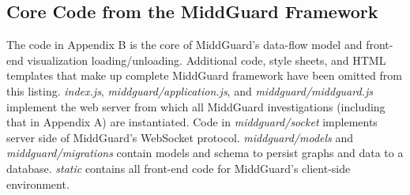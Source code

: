 \documentclass[midd]{thesis}
\begin{document}
\begin{landscape}
  \chapter{Core Code from the MiddGuard Framework}

  \addtolength{\hoffset}{-2cm}
  \addtolength{\textheight}{2cm}

  \begin{multicols}{2}

    The code in Appendix B is the core of MiddGuard's data-flow model and
    front-end visualization loading/unloading. Additional code, style sheets,
    and HTML templates that make up complete MiddGuard framework have been
    omitted from this listing. \textit{index.js},
    \textit{middguard/application.js}, and \textit{middguard/middguard.js}
    implement the web server from which all MiddGuard investigations (including
    that in Appendix A) are instantiated. Code in
    \textit{middguard/socket} implements server side of MiddGuard's WebSocket
    protocol. \textit{middguard/models} and \textit{middguard/migrations}
    contain models and schema to persist graphs and data to a database.
    \textit{static} contains all front-end code for MiddGuard's client-side
    environment.








  \end{multicols}

  \addtolength{\hoffset}{2cm}
  \addtolength{\textheight}{-2cm}
\end{landscape}


\end{document}
